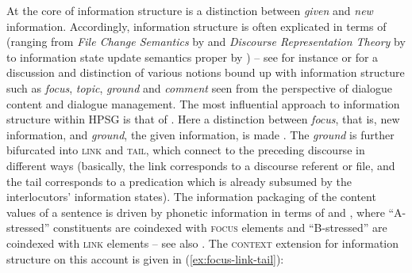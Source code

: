 \documentclass[output=paper
 	        ,biblatex
                ,babelshorthands
                ,newtxmath
                ,draftmode
                ,colorlinks, citecolor=brown
]{langscibook}
\begin{document}
At the core of information structure is a distinction between \emph{given} and \emph{new} information. 
%
Accordingly, information structure is often explicated in terms of  (ranging from \emph{File Change Semantics} by \citealt{Heim:2002} and \emph{Discourse Representation Theory} by \citealt{Kamp:Reyle:1993} to information state update semantics proper by \citealt{Traum:Larsson:2003}) -- see for instance \citet{Krifka:2008} or \citet{Vallduv`i2015} for a discussion and distinction of various notions bound up with information structure such as \emph{focus}, \emph{topic}, \emph{ground} and \emph{comment} seen from the perspective of dialogue content and dialogue management.
%
The most influential approach to information structure within HPSG is that of \citet{Engdahl:Vallduvi:1996}.
%
Here a distinction between \emph{focus}, that is, new information, and \emph{ground}, the given information, is made \citep[]{Engdahl:Vallduvi:1996}. 
%
The \emph{ground} is further bifurcated into \textsc{link} and \textsc{tail}, which connect to the preceding discourse in different ways (basically, the link corresponds to a discourse referent or file, and the tail corresponds to a predication which is already subsumed by the interlocutors' information states).
%
The information packaging of the content values of a sentence is driven by phonetic information in terms of  and  \citep[Chapter~6]{Jackendoff:1972}, where \enquote{A-stressed} constituents are coindexed with \textsc{focus} elements and \enquote{B-stressed} are coindexed with \textsc{link} elements -- see also .
%
The \textsc{context} extension for information structure on this account is given in (\ref{ex:focus-link-tail}):
%
\ea \label{ex:focus-link-tail}
\z
\end{document}
